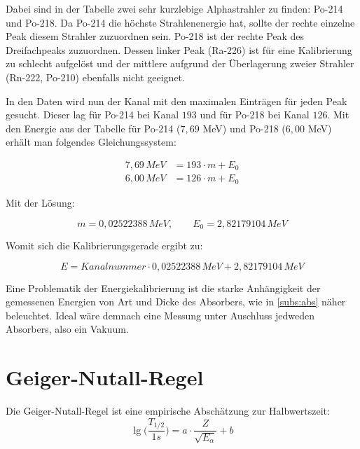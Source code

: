 Dabei sind in der Tabelle zwei sehr kurzlebige Alphastrahler zu finden: Po-214 und Po-218. Da Po-214 die höchste Strahlenenergie hat, 
sollte der rechte einzelne Peak diesem Strahler zuzuordnen sein. Po-218 ist der rechte Peak des Dreifachpeaks zuzuordnen. Dessen 
linker Peak (Ra-226) ist für eine Kalibrierung zu schlecht aufgelöst und der mittlere aufgrund der Überlagerung zweier Strahler 
(Rn-222, Po-210) ebenfalls nicht geeignet. \footnotemark
{}

In den Daten wird nun der Kanal mit den maximalen Einträgen für jeden Peak gesucht. Dieser lag für Po-214 bei Kanal $193$ und 
für Po-218 bei Kanal $126$. Mit den Energie aus der Tabelle für Po-214 ($7,69$ MeV) und Po-218 ($6,00$ MeV) erhält man folgendes 
Gleichungssystem:

\begin{align*}{}
    7,69 \, MeV &= 193 \cdot m + E_0 \\
    6,00 \, MeV &= 126 \cdot m + E_0
\end{align*}

Mit der Lösung:

\begin{equation*}
    m = 0,02522388 \, MeV, \qquad E_0 = 2,82179104 \, MeV
\end{equation*}

Womit sich die Kalibrierungsgerade ergibt zu:

\begin{equation}
    E = Kanalnummer \cdot 0,02522388 \, MeV + 2,82179104 \, MeV
\end{equation}

Eine Problematik der Energiekalibrierung ist die starke Anhängigkeit der gemessenen Energien von Art und Dicke des Absorbers, wie in 
\ref{subs:abs} näher beleuchtet. Ideal wäre demnach eine Messung unter Auschluss jedweden Absorbers, also ein Vakuum.\\





\section{Geiger-Nutall-Regel}

Die Geiger-Nutall-Regel ist eine empirische Abschätzung zur Halbwertszeit:\\
\begin{equation}
    \lg \biggl (\frac{T_{1/2}}{1s} \biggl ) = a \cdot \frac{Z}{\sqrt{E_{\alpha}}} + b
    \label{eq:gnr}
\end{equation}


